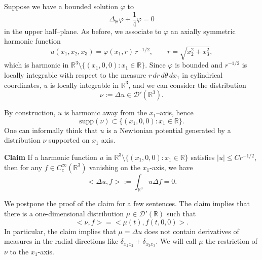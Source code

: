 \documentclass{article}
\newcommand{\R}{\mathbb{R}}
\begin{document}
Suppose we have a bounded solution $\varphi$ to
\[
\Delta_{\mathbb H}\varphi + \frac{1}{4}\varphi = 0
\]
in the upper half–plane. As before, we associate to $\varphi$ an axially symmetric harmonic function
\[
u(x_1,x_2,x_3) = \varphi(x_1,r)\,r^{-1/2}, \qquad r = \sqrt{x_2^2 + x_3^2},
\]
which is harmonic in $\R^3\setminus\{(x_1,0,0):x_1\in\R\}$. Since $\varphi$ is bounded and
$r^{-1/2}$ is locally integrable with respect to the measure $r\,dr\,d\theta\,dx_1$ in cylindrical coordinates, 
$u$ is locally integrable in $\R^3$, and we can consider the distribution
\[
\nu := \Delta u \in \mathcal D'(\R^3).
\]

By construction, $u$ is harmonic away from the $x_1$–axis, hence
\[
\text{supp} (\nu) \subset \{(x_1,0,0):x_1\in\R\}.
\]
One can informally think that $u$ is a Newtonian potential generated by a distribution $\nu$ supported on $x_1$ axis.

\textbf{Claim} If a harmonic function $u$ in $\R^3\setminus\{(x_1,0,0):x_1\in\R\}$ satisfies $|u|\leq C r^{-1/2}$, then for any $f \in C_c^{\infty}(\mathbb{R}^3)$ vanishing on the $x_1$-axis, we have
$$ <\Delta u, f>:=\int_{\mathbb{R}^3} u \Delta f=0.$$

We postpone the proof of the claim for a few sentences. The claim implies that there is a one-dimensional distribution $\mu \in \mathcal{D}'(\R)$ such that
$$ <\nu,f>=<\mu(t),f(t,0,0)>.$$
In particular, the claim implies that $\mu=\Delta u$ does not contain derivatives of measures in the radial directions like $\delta_{x_2x_2}+\delta_{x_3x_3}$. 
We will call $\mu$ the restriction of $\nu$ to the $x_1$-axis.
\end{document}
